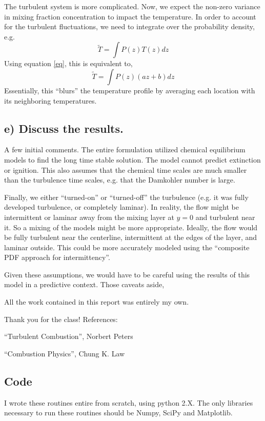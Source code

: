 \documentclass{article}
\begin{document}
The turbulent system is more complicated. Now, we expect the non-zero
variance in mixing fraction concentration to impact the temperature. 
In order to account for the turbulent fluctuations, we need to integrate
over the probability density, e.g.
\begin{equation}
 \tilde T = \int P(z) T(z) dz
\end{equation}
Using equation \ref{eq}, this is equivalent to, 
\begin{equation}
 \tilde T = \int P(z) (a z + b) dz
\end{equation}
Essentially, this ``blurs'' the temperature profile by averaging each
location with its neighboring temperatures. 


\subsection*{e) Discuss the results.}

A few initial comments. The entire formulation utilized chemical
equilibrium models to find the long time stable solution. The model
cannot predict extinction or ignition. This also assumes that the
chemical time scales are much smaller than the turbulence time scales,
e.g. that the Damkohler number is large.  

Finally, we either ``turned-on'' or ``turned-off'' the turbulence
(e.g. it was fully developed turbulence, or completely laminar). In
reality, the flow might be intermittent or laminar away from the mixing
layer at $y=0$ and turbulent near it. So a mixing of the models might be
more appropriate. Ideally, the flow would be fully turbulent near the
centerline, intermittent at the edges of the layer, and laminar
outside. This could be more accurately modeled using the ``composite PDF
approach for intermittency''. 

Given these assumptions, we would have to be careful using the results
of this model in a predictive context. Those caveats aside, 


\newpage
All the work contained in this report was entirely my own. 

Thank you for the class! 
\vspace{1in}
\newline
References:

``Turbulent Combustion'', Norbert Peters

``Combustion Physics'', Chung K. Law


\subsection*{Code}
I wrote these routines entire from scratch, using python 2.X. The only
libraries necessary to run these routines should be Numpy, SciPy and
Matplotlib.  

\end{document}
